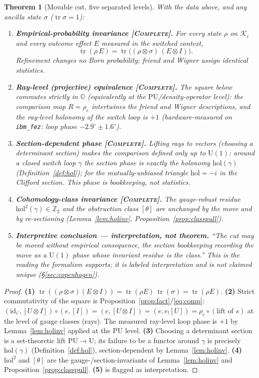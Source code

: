 \documentclass[11pt]{article}
\newtheorem{theorem}{Theorem}
\theoremstyle{definition}
\theoremstyle{remark}
\newcommand{\K}{\mathcal K}
\newcommand{\Oc}{\mathbb O}
\newcommand{\U}{\mathrm{U}}
\newcommand{\PU}{\mathrm{PU}}
\newcommand{\id}{\mathrm{id}}
\newcommand{\tr}{\operatorname{tr}}
\newcommand{\hol}{\mathrm{hol}}
\newcommand{\Zt}{\mathbb Z_2}
\newcommand{\pushf}[1]{{#1}_{!}}
\newcommand{\STC}{{\normalfont\textsc{[Complete]}}}
\begin{document}
\begin{theorem}[Movable cut, five separated levels]\label{thm:cut}
With the data above, and any ancilla state $\sigma$ ($\tr\sigma=1$):
\begin{enumerate}[label=\textbf{(\arabic*)},leftmargin=2.6em]
\item \textbf{Empirical-probability invariance \STC.} For every state $\rho$ on
$\K_\iota$ and every outcome effect $E$ measured in the switched context,
\[
\tr(\rho\,E)=\tr\!\bigl((\rho\otimes\sigma)\,(E\otimes I)\bigr).
\]
Refinement changes no Born probability; friend and Wigner assign identical statistics.
\item \textbf{Ray-level (projective) equivalence \STC.} The square below commutes
\emph{strictly} in $\Oc$ (equivalently at the $\PU$/density-operator level): the
comparison map $R=\rho_e$ intertwines the friend and Wigner descriptions, and the
ray-level holonomy of the switch loop is $+1$ (hardware-measured on \texttt{ibm\_fez}:
loop phase $-2.9^\circ\pm1.6^\circ$).
\item \textbf{Section-dependent phase \STC.} Lifting rays to vectors (choosing a
determinant section) makes the comparison defined only up to $\U(1)$: around a closed
switch loop $\gamma$ the section phase is exactly the holonomy $\hol(\gamma)$
(Definition~\ref{def:hol}); for the mutually-unbiased triangle $\hol=-i$ in the Clifford
section. This phase is bookkeeping, not statistics.
\item \textbf{Cohomology-class invariance \STC.} The gauge-robust residue
$\hol^2(\gamma)\in\Zt$ and the obstruction class $[\theta]$ are unchanged by the move
and by re-sectioning (Lemma~\ref{lem:holinv}, Proposition~\ref{prop:classpull}).
\item \textbf{Interpretive conclusion --- \emph{interpretation, not theorem}.} ``The
cut may be moved without empirical consequence, the section bookkeeping recording the
move as a $\U(1)$ phase whose invariant residue is the class.'' This is the reading the
formalism \emph{supports}; it is labeled interpretation and is not claimed unique
(\S\ref{sec:copenhagen}).
\end{enumerate}
\end{theorem}

\begin{proof}
\textbf{(1)} $\tr((\rho\otimes\sigma)(E\otimes I))=\tr(\rho E)\,\tr(\sigma)=\tr(\rho E)$.
\textbf{(2)} Strict commutativity of the square is
Proposition~\ref{prop:fact}/\eqref{eq:comp}: $(\id_{\iota'},[U\otimes
I])\circ(e,[I])=(e,[U\otimes I])=(e,\pushf e[U])=\rho_e\circ(\text{lift of }s)$ at the
level of gauge classes (rays). The measured ray-level loop phase is $+1$ by
Lemma~\ref{lem:holinv} applied at the $\PU$ level.
\textbf{(3)} Choosing a determinant section is a set-theoretic lift
$\PU\to\U$; its failure to be a functor around $\gamma$ is precisely $\hol(\gamma)$
(Definition~\ref{def:hol}), section-dependent by Lemma~\ref{lem:holinv}.
\textbf{(4)} $\hol^2$ and $[\theta]$ are the gauge-/section-invariants of
Lemma~\ref{lem:holinv} and Proposition~\ref{prop:classpull}.
\textbf{(5)} is flagged as interpretation. \end{proof}
\end{document}
